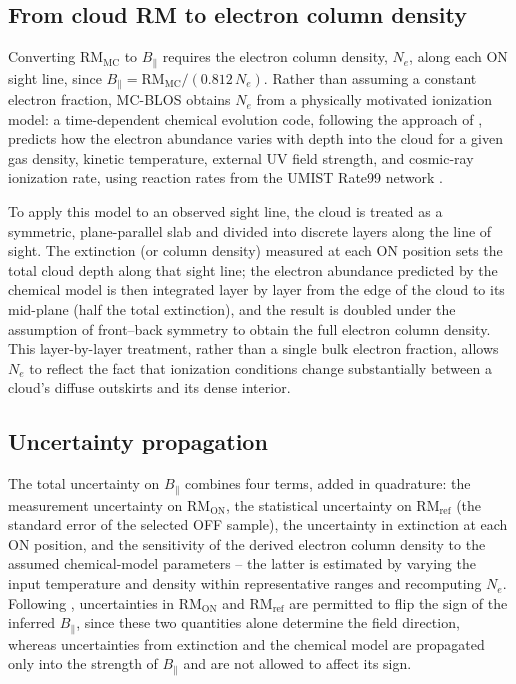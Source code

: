 \documentclass[twocolumn]{aastex631}
\begin{document}
\subsection{From cloud RM to electron column density}
\label{sec:method-ne}

Converting $\mathrm{RM_{MC}}$ to $B_\parallel$ requires the electron column density, $N_e$, along each ON sight line, since $B_\parallel = \mathrm{RM_{MC}} / (0.812\,N_e)$. Rather than assuming a constant electron fraction, MC-BLOS obtains $N_e$ from a physically motivated ionization model: a time-dependent chemical evolution code, following the approach of \citet{gibson2009}, predicts how the electron abundance varies with depth into the cloud for a given gas density, kinetic temperature, external UV field strength, and cosmic-ray ionization rate, using reaction rates from the UMIST Rate99 network \citep{leteuff2000}.

To apply this model to an observed sight line, the cloud is treated as a symmetric, plane-parallel slab and divided into discrete layers along the line of sight. The extinction (or column density) measured at each ON position sets the total cloud depth along that sight line; the electron abundance predicted by the chemical model is then integrated layer by layer from the edge of the cloud to its mid-plane (half the total extinction), and the result is doubled under the assumption of front--back symmetry to obtain the full electron column density. This layer-by-layer treatment, rather than a single bulk electron fraction, allows $N_e$ to reflect the fact that ionization conditions change substantially between a cloud's diffuse outskirts and its dense interior.

\subsection{Uncertainty propagation}
\label{sec:method-uncertainty}

The total uncertainty on $B_\parallel$ combines four terms, added in quadrature: the measurement uncertainty on $\mathrm{RM_{ON}}$, the statistical uncertainty on $\mathrm{RM_{ref}}$ (the standard error of the selected OFF sample), the uncertainty in extinction at each ON position, and the sensitivity of the derived electron column density to the assumed chemical-model parameters -- the latter is estimated by varying the input temperature and density within representative ranges and recomputing $N_e$. Following \citet{tahani2025mcblos}, uncertainties in $\mathrm{RM_{ON}}$ and $\mathrm{RM_{ref}}$ are permitted to flip the sign of the inferred $B_\parallel$, since these two quantities alone determine the field direction, whereas uncertainties from extinction and the chemical model are propagated only into the strength of $B_\parallel$ and are not allowed to affect its sign.
\end{document}
